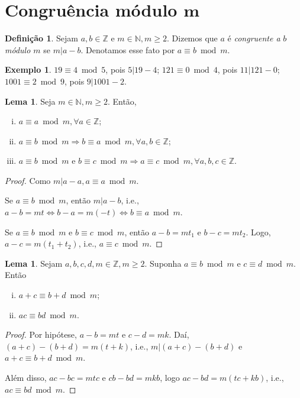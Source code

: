\documentclass[a4paper,11pt,twoside, leqno]{article}
\theoremstyle{definition}
\newtheorem*{definition}{Definição}
\newtheorem{lemma}[theorem]{Lema}
\newtheorem*{example}{Exemplo}
\begin{document}
\section{Congruência módulo $\mathbf{m}$}
\begin{definition}
	\label{def congruencia}
	Sejam $a,b\in\mathbb{Z}$ e $m\in\mathbb{N}, m\geq 2$. Dizemos que $a$ é {\em congruente a} $b$ {\em módulo $m$} se $m|a-b$. Denotamos esse fato por $a\equiv b\bmod m$.
\end{definition}
\begin{example}
	$19\equiv 4\bmod 5$, pois $5|19-4$; $121\equiv 0\bmod 4$, pois $11|121-0$; $1001\equiv 2\bmod 9$, pois $9|1001-2$.
\end{example}
\begin{lemma}
	\label{lema 28}
	Seja $m\in\mathbb{N}, m\geq 2$. Então,
	\begin{enumerate}[(i)]
		\item $a\equiv a\bmod m, \forall a\in\mathbb{Z}$;
		\item $a\equiv b\bmod m \Rightarrow b\equiv a\bmod m, \forall a,b\in\mathbb{Z}$;
		\item $a\equiv b\bmod m$ e $b\equiv c\bmod m \Rightarrow a\equiv c\bmod m, \forall a,b,c\in\mathbb{Z}$.
	\end{enumerate}
\end{lemma}
\begin{proof}
	Como $m|a-a, a\equiv a\bmod m$. 
	
	Se $a\equiv b\bmod m$, então $m|a-b$, i.e., $a-b = mt\Leftrightarrow b-a=m(-t) \Leftrightarrow b\equiv a\bmod m$.
	
	Se $a\equiv b\bmod m$ e $b\equiv c\bmod m$, então $a-b=mt_1$ e $b-c=mt_2$. Logo, $a - c = m(t_1+t_2)$, i.e., $a\equiv c\bmod m$.
\end{proof}
\begin{lemma}
	\label{lema 29}
	Sejam $a,b,c,d,m\in\mathbb{Z}, m\geq 2$. Suponha $a\equiv b\bmod m$ e $c\equiv d\bmod m$. Então
	\begin{enumerate}[(i)]
		\item $a+c\equiv b+d\bmod m$;
		\item $ac\equiv bd\bmod m$.
	\end{enumerate}
\end{lemma}
\begin{proof}
	Por hipótese, $a - b = mt$ e $c - d = mk$. Daí, $(a+c)-(b+d) = m(t+k)$, i.e., $m|(a+c)-(b+d)$ e $a+c\equiv b+d\bmod m$.
	
	Além disso, $ac - bc = mtc$ e $cb - bd = mkb$, logo $ac - bd = m(tc+kb)$, i.e., $ac\equiv bd\bmod m$.
\end{proof}
\end{document}
